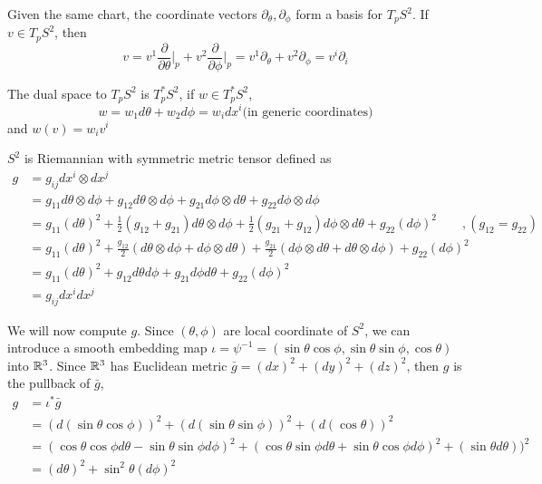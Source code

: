 \documentclass[12pt]{article}
\begin{document}
Given the same chart, the coordinate vectors $\partial_\theta, \partial_\phi$ form a basis for $T_pS^2$. If $v \in T_pS^2$, then  $$v = v^1 \frac{\partial}{\partial \theta}\bigg\rvert_p + v^2 \frac{\partial}{\partial \phi}\bigg\rvert_p = v^1\partial_\theta + v^2 \partial_\phi = v^i \partial_i $$

The dual space to $T_pS^2$ is $T^*_pS^2$, if $w \in T^*_pS^2$, $$w = w_1 d\theta + w_2 d\phi = w_i dx^i \text{(in generic coordinates)}$$
and $w(v) = w_i v^i$

$S^2$ is Riemannian with symmetric metric tensor defined as 
$$
\begin{aligned}
	g &= g_{ij}dx^i \otimes dx^j  \\
	  &= g_{11}d\theta\otimes d\phi + g_{12}d\theta \otimes d\phi + g_{21}d\phi \otimes d\theta + g_{22} d\phi \otimes d\phi \\
	  &= g_{11}(d\theta)^2 + \frac{1}{2}(g_{12} + g_{21}) d\theta \otimes d\phi +  \frac{1}{2}(g_{21} + g_{12})  d\phi\otimes d\theta +  g_{22} (d\phi)^2 \qquad ,(g_{12} = g_{22}) \\
	  &= g_{11}(d\theta)^2 + \frac{g_{12}}{2}(d\theta \otimes d\phi + d\phi\otimes d\theta) + \frac{g_{21}}{2}(d\phi\otimes d\theta + d\theta \otimes d\phi) + g_{22} (d\phi)^2 \\
	  &= g_{11}(d\theta)^2 + g_{12}d\theta d\phi + g_{21}d\phi d\theta + g_{22} (d\phi)^2 \\
	  &= g_{ij}dx^i dx^j
\end{aligned}$$

We will now compute $g$. Since $(\theta, \phi)$ are local coordinate  of $S^2$, we can introduce  a smooth embedding map $\iota = \psi^{-1} = (\sin\theta \cos\phi, \sin\theta\sin\phi, \cos\theta)$ into $\mathbb{R}^3$. Since $\mathbb{R}^3$ has Euclidean metric $\bar{g} = (dx)^2 + (dy)^2 + (dz)^2$, then $g$ is the pullback of $\bar{g}$,
$$\begin{aligned} 
	g &= \iota^*\bar{g} \\
	  &= (d(\sin\theta \cos\phi))^2 + (d(\sin\theta\sin\phi))^2 + (d(\cos\theta))^2\\
	  &= (\cos\theta \cos\phi d\theta - \sin\theta \sin\phi d\phi)^2 + (\cos\theta\sin\phi d\theta + \sin\theta\cos\phi d\phi)^2 + (\sin\theta d\theta))^2\\
	  &= (d\theta)^2 + \sin^2\theta (d\phi)^2
\end{aligned} 
$$
\end{document}
